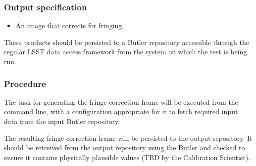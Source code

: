 \subsubsection{Output specification}

\begin{itemize}

  \item{An image that corrects for fringing.}

\end{itemize}

These products should be persisted to a Butler repository accessible through
the regular LSST data access framework from the system on which the test is
being run.

\subsubsection{Procedure}

The task for generating the fringe correction frame will be executed from the
command line, with a configuration appropriate for it to fetch required input
data from the input Butler repository.

The resulting fringe correction frame will be persisted to the output
repository. It should be retreived from the output repository using the Butler
and checked to ensure it contains physically plausible values (TBD by the
Calibration Scientist).
